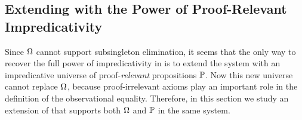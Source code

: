 

\subsection{Extending \SetoidCC with the Power of Proof-Relevant Impredicativity}

Since \( \Omega \) cannot support subsingleton elimination, it seems that the 
only way to recover the full power of impredicativity in \SetoidCC is to extend 
% 
the system with an impredicative universe of proof-\emph{relevant} propositions 
\( \mathbb{P} \). 
% 
% 
Now this new universe cannot replace \( \Omega \), because 
proof-irrelevant axioms play an important role in the definition of
the observational equality. 
% 
Therefore, in this section we study an extension of \SetoidCC that supports both \( \Omega \) 
and \( \mathbb{P} \) in the same system.
% 

